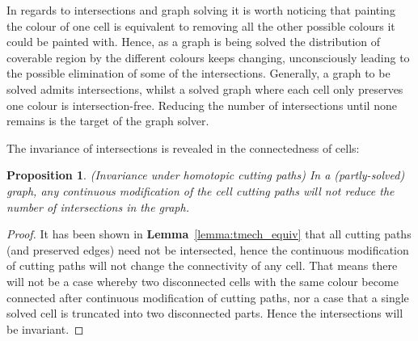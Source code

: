 \documentclass[journal]{IEEEtran}
\newtheorem{proposition}[theorem]{Proposition}
\begin{document}
In regards to intersections and graph solving it is worth noticing that painting the colour of one cell is equivalent to removing all the 
other possible colours it could be painted with. Hence, as a graph is being solved the distribution of coverable region by the different colours 
keeps changing, unconsciously leading to the possible elimination of some of the intersections. 
Generally, a graph to be solved admits intersections, whilst a solved graph where each cell only preserves one colour is %
intersection-free. 
Reducing the number of intersections until none remains is the target of the graph solver.  

The invariance of intersections is revealed in the connectedness of cells: 

\begin{proposition}
\label{lemma:invariance}
(Invariance under homotopic cutting paths) In a (partly-solved) graph, any continuous modification of the cell cutting paths will not reduce the number of intersections in the graph. 
\end{proposition}
\begin{proof}
It has been shown in \textbf{Lemma}~\ref{lemma:tmech_equiv} that all cutting paths (and preserved edges) need not be intersected, hence the continuous modification of cutting paths will not change the connectivity of any cell. That means there will not be a case whereby two disconnected cells with the same colour become connected after continuous modification of cutting paths, nor a case that a single solved cell is truncated into two disconnected parts. Hence the intersections will be invariant. 
\end{proof}
\end{document}
